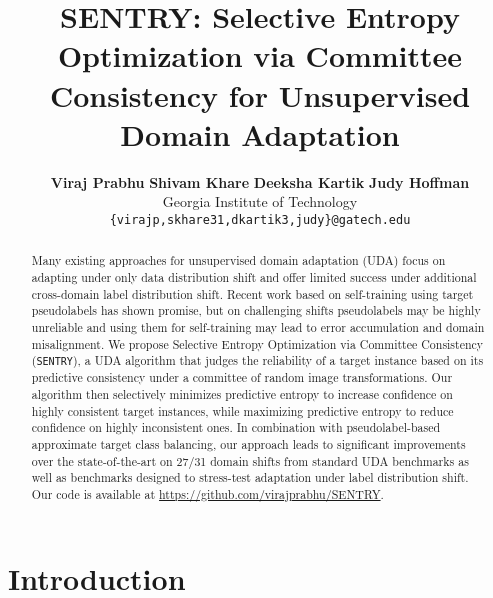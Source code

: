 \documentclass[10pt,twocolumn,letterpaper]{article}
\newcommand{\method}{\texttt{SENTRY}\xspace}
\begin{document}
\title{SENTRY: Selective Entropy Optimization via Committee Consistency for Unsupervised Domain Adaptation}

\author{
    \textbf{Viraj Prabhu}\qquad
    \textbf{Shivam Khare} \qquad
    \textbf{Deeksha Kartik} \qquad 
    \textbf{Judy Hoffman} \qquad \\
    Georgia Institute of Technology \\
    {\small\texttt{\{virajp,skhare31,dkartik3,judy\}@gatech.edu}}
}

\maketitle
\ificcvfinal\thispagestyle{empty}\fi

\vspace{-25pt}
\begin{abstract}
    \vspace{-7pt}
   Many existing approaches for unsupervised domain adaptation (UDA) focus on adapting under only data distribution shift and offer limited success under additional cross-domain label distribution shift. Recent work based on self-training using target pseudolabels has shown promise, but on challenging shifts pseudolabels may be highly unreliable and using them for self-training may lead to error accumulation and domain misalignment. We propose Selective Entropy Optimization via Committee Consistency (\method), a UDA algorithm that judges the reliability of a target instance based on its predictive consistency under a committee of random image transformations. Our algorithm then selectively minimizes predictive entropy to increase confidence on highly consistent target instances, while maximizing predictive entropy to reduce confidence on highly inconsistent ones. In combination with pseudolabel-based approximate target class balancing, our approach leads to  significant improvements over the state-of-the-art on 27/31 domain shifts from standard UDA benchmarks as well as benchmarks designed to stress-test adaptation under label distribution shift. Our code is available at \url{https://github.com/virajprabhu/SENTRY}.
    \vspace{-7pt}
\end{abstract}
\vspace{-15pt}

\section{Introduction}
\label{ref:intro}
\vspace{-5pt}
\end{document}
